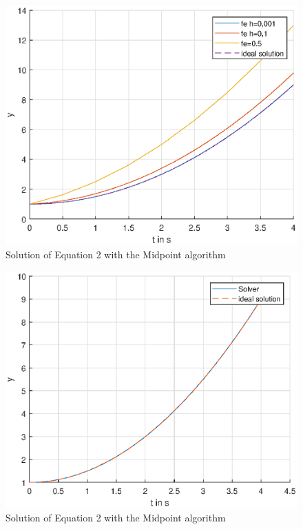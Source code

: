 \begin{figure}[H]
    \centering
    \includegraphics[width=\plotwidth]{plots/rk_only_equation_2.eps}
    \caption{Solution of Equation 2 with the Midpoint algorithm}
    \label{fig:eq2_rk_only}
\end{figure}
\begin{figure}[H]
    \centering
    \includegraphics[width=\plotwidth]{plots/vs_only_equation_2.eps}
    \caption{Solution of Equation 2 with the Midpoint algorithm}
    \label{fig:eq2_rk_only}
\end{figure}

